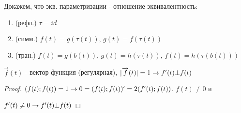 \documentclass[12pt, fleqn]{article}
\begin{document}
Докажем, что экв. параметризации - отношение эквивалентность:
\begin{enumerate}
    \item (рефл.) $\tau=id$
    \item (симм.) $f(t)=g(\tau(t))$, $g(t)=f(\tau(t))$
    \item (тран.) $f(t)=g(b(t))$, $g(t)=h(\tau(t))$, $f(t)=h(\tau(b(t)))$
\end{enumerate}

\begin{lemma}
    $\overrightarrow{f}(t)$ - вектор-функция (регулярная), $|\overrightarrow{f}(t)|=1 \rightarrow f'(t) \bot f(t)$
\end{lemma}

\begin{proof}
    $(f(t);f(t))=1 \rightarrow 0=(f(t);f(t))'=2(f'(t);f(t))$. $f(t) \neq 0$ и
    
    $f'(t) \neq 0 \rightarrow f'(t) \bot f(t)$
\end{proof}
\end{document}
